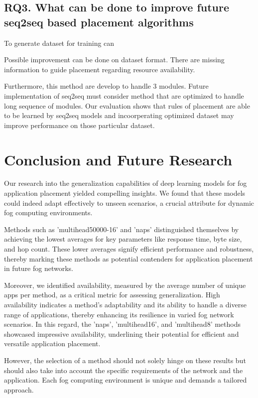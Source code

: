 \documentclass[conference]{IEEEtran}
\begin{document}
\subsection*{RQ3. What can be done to improve future seq2seq based placement algorithms}

To generate dataset for training can 

Possible improvement can be done on dataset format. There are missing information to guide placement regarding resource availability. 

Furthermore, this method are develop to handle 3 modules. Future implementation of seq2seq must consider method that are optimized to handle long sequence of modules. Our evaluation shows that rules of placement are able to be learned by seq2seq models and incoorperating optimized dataset may improve performance on those particular dataset.

\section{Conclusion and Future Research}

Our research into the generalization capabilities of deep learning models for fog application placement yielded compelling insights. We found that these models could indeed adapt effectively to unseen scenarios, a crucial attribute for dynamic fog computing environments.

Methods such as 'multihead50000-16' and 'naps' distinguished themselves by achieving the lowest averages for key parameters like response time, byte size, and hop count. These lower averages signify efficient performance and robustness, thereby marking these methods as potential contenders for application placement in future fog networks.

Moreover, we identified availability, measured by the average number of unique apps per method, as a critical metric for assessing generalization. High availability indicates a method's adaptability and its ability to handle a diverse range of applications, thereby enhancing its resilience in varied fog network scenarios. In this regard, the 'naps', 'multihead16', and 'multihead8' methods showcased impressive availability, underlining their potential for efficient and versatile application placement.

However, the selection of a method should not solely hinge on these results but should also take into account the specific requirements of the network and the application. Each fog computing environment is unique and demands a tailored approach.
\end{document}
